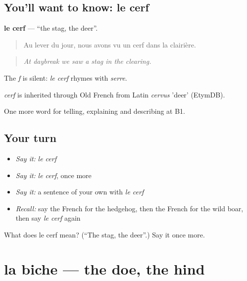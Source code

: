 \subsection*{You'll want to know: le cerf}
\textbf{le cerf} — \textquotedblleft{}the stag, the deer\textquotedblright{}.

\begin{quote}
Au lever du jour, nous avons vu un cerf dans la clairière.
\end{quote}

\begin{quote}
\emph{At daybreak we saw a stag in the clearing.}
\end{quote}

The \emph{f} is silent: \emph{le cerf} rhymes with \emph{serre}.

\begin{cousinweb}
\emph{cerf} is inherited through Old French from Latin \emph{cervus} 'deer' (EtymDB).
\end{cousinweb}

\begin{grammarlens}[title={What you've built}]
One more word for telling, explaining and describing at B1.
\end{grammarlens}

\subsection*{Your turn}
\begin{itemize}
\raggedright
  \item \emph{Say it:} \emph{le cerf}
  \item \emph{Say it:} \emph{le cerf}, once more
  \item \emph{Say it:} a sentence of your own with \emph{le cerf}
  \item \emph{Recall:} say the French for the hedgehog, then the French for the wild boar, then say \emph{le cerf} again
\end{itemize}

\begin{tcolorbox}[breakable,colback=teal!4,colframe=teal!35!black,title={Before you move on}]
What does le cerf mean? (\textquotedblleft{}The stag, the deer\textquotedblright{}.) Say it once more.
\end{tcolorbox}
\section[la biche]{la biche — the doe, the hind}

